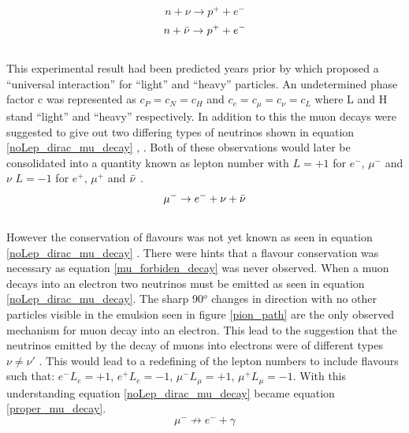 \documentclass[12pt,a4paper]{article}
\begin{document}
\begin{equation}
    n + \nu \rightarrow p^+ + e^-
    \label{no_lepNo_dirac_nu_capture}
\end{equation}
\begin{equation}
    n + \Bar{\nu} \rightarrow p^+ + e^-
    \label{no_lepNo_maj_nu_capture}
\end{equation}
\\This experimental result had been predicted years prior by \cite{konopinski1953universal} which proposed a ``universal interaction'' for ``light'' and ``heavy'' particles. An undetermined phase factor c was represented as $c_P=c_N=c_H$ and $c_e=c_\mu=c_\nu=c_L$ where L and H stand ``light'' and ``heavy'' respectively. In addition to this the muon decays were suggested to give out two differing types of neutrinos shown in equation \ref{noLep_dirac_mu_decay} \cite{griffiths2008book} \cite{griffiths2008neutrino1.5}, \cite{konopinski1953universal}. Both of these observations would later be consolidated into a quantity known as lepton number with $L=+1$ for $e^-$, $\mu^-$ and $\nu$ $L=-1$ for $e^+$, $\mu^+$ and $\Bar{\nu}$ \cite{griffiths2008book}\cite{griffiths2008neutrino1.5}. 
\begin{equation}
    \mu^- \rightarrow e^- + \nu + \Bar{\nu}
    \label{noLep_dirac_mu_decay}
\end{equation}
\\However the conservation of flavours was not yet known as seen in equation \ref{noLep_dirac_mu_decay} \cite{griffiths2008book} \cite{griffiths2008neutrino1.5}. There were hints that a flavour conservation was necessary as equation \ref{mu_forbiden_decay} was never observed. When a muon decays into an electron two neutrinos must be emitted as seen in equation \ref{noLep_dirac_mu_decay}. The sharp 90$^o$ changes in direction with no other particles visible in the emulsion seen in figure \ref{pion_path} are the only observed mechanism for muon decay into an electron. This lead to the suggestion that the neutrinos emitted by the decay of muons into electrons were of different types $\nu \not= \nu'$ \cite{Lee:1960tja} \cite{griffiths2008book} \cite{griffiths2008neutrino1.5}. This would lead to a redefining of the lepton numbers to include flavours such that: $e^- L_e = +1$, $e^+ L_e = -1$, $\mu^- L_\mu = +1 $, $\mu^+ L_\mu = -1 $. With this understanding equation \ref{noLep_dirac_mu_decay} became equation \ref{proper_mu_decay}.
\begin{equation}
    \mu^- \not\to e^- + \gamma
    \label{mu_forbiden_decay}
\end{equation}
\end{document}
